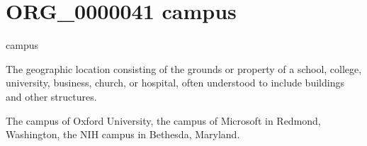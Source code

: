 \documentclass[letterpaper,10pt,english]{sphinxmanual}
\begin{document}
\begin{sphinxShadowBox}

\sphinxAtStartPar
{}
\end{sphinxShadowBox}
\begin{quote}
\label{\detokenize{doc-ORG_0000041:org-0000041}}\label{\detokenize{doc-ORG_0000041:campus}}\label{\detokenize{doc-ORG_0000041:org-0000041}}
\ignorespaces \end{quote}


\section{ORG\_0000041 \sphinxhyphen{} campus}
\label{\detokenize{doc-ORG_0000041:org-0000041-campus}}\label{\detokenize{doc-ORG_0000041:index-0}}\label{\detokenize{doc-ORG_0000041::doc}}
\begin{sphinxShadowBox}

\sphinxAtStartPar
campus
\end{sphinxShadowBox}

\begin{sphinxShadowBox}

\sphinxAtStartPar
The geographic location consisting of the  grounds or property of a school, college, university, business, church, or hospital, often understood to include buildings and other structures.
\end{sphinxShadowBox}

\begin{sphinxShadowBox}

\sphinxAtStartPar
{}
\end{sphinxShadowBox}

\begin{sphinxShadowBox}

\sphinxAtStartPar
The campus of Oxford University, the campus of Microsoft in Redmond, Washington, the NIH campus in Bethesda, Maryland.
\end{sphinxShadowBox}

\begin{sphinxShadowBox}

\sphinxAtStartPar
{}
\end{sphinxShadowBox}
\end{document}
